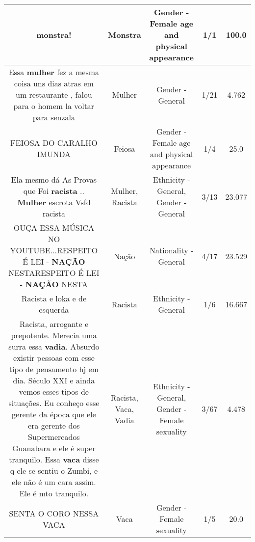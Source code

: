 \documentclass[11pt]{article}
\newlength\mylength
\begin{document}
\begin{center}
\begin{longtable}{|C{.65\mylength}|C{.30\mylength}|C{.12\mylength}|C{.12\mylength}|C{.12\mylength}|}
  \small monstra!\normalsize   & Monstra & Gender - Female age and physical appearance & 1/1 & 100.0 \\  \hline
  \small Essa \textbf{mulher} fez a mesma coisa uns dias atras em um restaurante , falou para o homem la voltar para senzala\normalsize   & Mulher & Gender - General & 1/21 & 4.762 \\  \hline
  \small FEIOSA DO CARALHO IMUNDA\normalsize   & Feiosa & Gender - Female age and physical appearance & 1/4 & 25.0 \\  \hline
  \small Ela mesmo dá As Provas que Foi \textbf{racista} .. \textbf{Mulher} escrota Vsfd racista\normalsize   & Mulher, Racista & Ethnicity - General, Gender - General & 3/13 & 23.077 \\  \hline
  \small OUÇA ESSA MÚSICA NO YOUTUBE...RESPEITO É LEI - \textbf{NAÇÃO} NESTARESPEITO É LEI - \textbf{NAÇÃO} NESTA\normalsize   & Nação & Nationality - General & 4/17 & 23.529 \\  \hline
  \small Racista e loka e de esquerda\normalsize   & Racista & Ethnicity - General & 1/6 & 16.667 \\  \hline
  \small Racista, arrogante e prepotente. Merecia uma surra essa \textbf{vadia}. Absurdo existir pessoas com esse tipo de pensamento hj em dia. Século XXI e ainda vemos esses tipos de situações. Eu conheço esse gerente da época que ele era gerente dos Supermercados Guanabara e ele é super tranquilo. Essa \textbf{vaca} disse q ele se sentiu o Zumbi, e ele não é um cara assim. Ele é mto tranquilo.\normalsize   & Racista, Vaca, Vadia & Ethnicity - General, Gender - Female sexuality & 3/67 & 4.478 \\  \hline
  \small SENTA O CORO NESSA VACA\normalsize   & Vaca & Gender - Female sexuality & 1/5 & 20.0 \\  \hline

\end{longtable}
\end{center}
\end{document}
